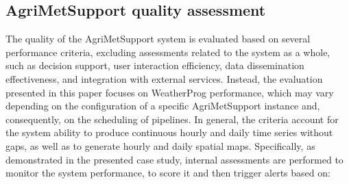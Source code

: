 \documentclass[authoryear,preprint,review,12pt]{elsarticle}
\begin{document}

\subsection{AgriMetSupport quality assessment}
The quality of the AgriMetSupport system is evaluated based on several performance criteria, excluding assessments related to the system as a whole, such as decision support, user interaction efficiency, data dissemination effectiveness, and integration with external services.
Instead, the evaluation presented in this paper focuses on WeatherProg performance, which may vary depending on the configuration of a specific AgriMetSupport instance and, consequently, on the scheduling of pipelines.
In general, the criteria account for the system ability to produce continuous hourly and daily time series without gaps, as well as to generate hourly and daily spatial maps.
Specifically, as demonstrated in the presented case study, internal assessments are performed to monitor the system performance, to score it and then trigger alerts based on:
\end{document}
